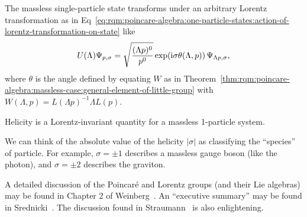 \begin{corollary}
The massless single-particle state transforms under an arbitrary Lorentz
transformation as in Eq~\eqref{eq:rqm:poincare-algebra:one-particle-states:action-of-lorentz-transformation-on-state}
like
\begin{equation}
U(\Lambda)\Psi_{p,\sigma} = \sqrt{\frac{(\Lambda p)^{0}}{p^{0}}}\exp(\mathrm{i}\sigma\theta(\Lambda,p))\,\Psi_{\Lambda p,\sigma},
\end{equation}
where $\theta$ is the angle defined by equating $W$ as in Theorem~\ref{thm:rqm:poincare-algebra:massless-case:general-element-of-little-group}
with $W(\Lambda,p) = L(\Lambda p)^{-1}\Lambda L(p)$.
\end{corollary}

\begin{theorem}
Helicity is a Lorentz-invariant quantity for a massless 1-particle system.
\end{theorem}

\begin{remark}
We can think of the absolute value of the helicity $|\sigma|$ as
classifying the ``species'' of particle. For example, $\sigma=\pm1$
describes a massless gauge boson (like the photon), and $\sigma=\pm2$ describes
the graviton.
\end{remark}

A detailed discussion of the Poincar\'e and Lorentz groups (and their
Lie algebras) may be found in Chapter 2 of
Weinberg~\cite{Weinberg:1995mt}.
An ``executive summary'' may be found in Srednicki~\cite{Srednicki:2007qs}.
The discussion found in Straumann~\cite{Straumann:2008kq} is also enlightening.
